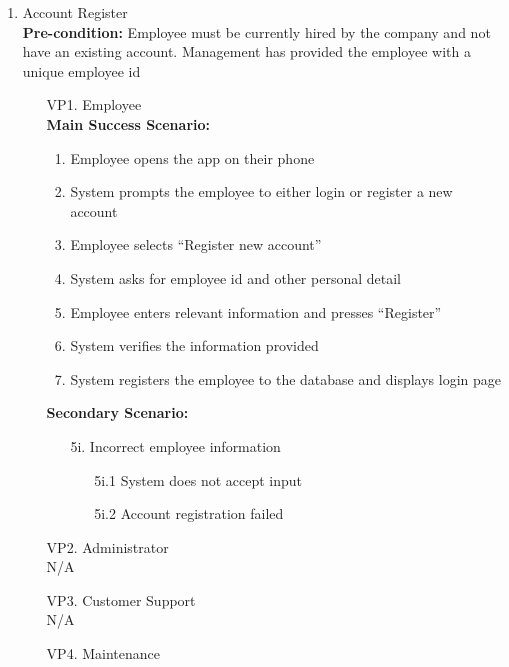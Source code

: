 \documentclass[]{article}
\begin{document}
\begin{enumerate}[{\bf BE1.}]
\begin{enumerate}[{\bf BE6.}]
    \item Account Register \\ 
        \textbf{Pre-condition:} Employee must be currently hired by the company and not have an existing account.  Management has provided the employee with a unique employee id
        \begin{enumerate}
            \item[VP1.] Employee \\
                \textbf{Main Success Scenario:}
                \begin{enumerate}
                    \item Employee opens the app on their phone   
                    \item System prompts the employee to either login or register a new account 
                    \item Employee selects “Register new account”  
                    \item System asks for employee id and other personal detail 
                    \item Employee enters relevant information and presses “Register” 
                    \item System verifies the information provided 
                    \item System registers the employee to the database and displays login page 
                \end{enumerate}
                \textbf{Secondary Scenario:}
                \begin{enumerate}
                    \item[5i.] Incorrect employee information
                    \begin{enumerate}
                        \item[5i.1] System does not accept input
                        \item[5i.2] Account registration failed
                    \end{enumerate}
                \end{enumerate}
            \item[VP2.] Administrator \\
            \indent N/A 
            \item[VP3.] Customer Support \\
            \indent N/A 
            \item[VP4.] Maintenance \\

\end{enumerate}
\end{enumerate}
\end{enumerate}
\end{document}

